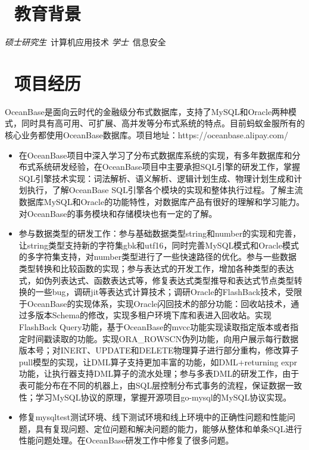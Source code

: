 \documentclass{resume}
\begin{document}


\section{\faGraduationCap\  教育背景}
\textit{硕士研究生}\ 计算机应用技术
\datedsubsection{\textbf{电子科技大学}}{2009 -- 2013}
\textit{学士}\ 信息安全\

\section{\faUsers\ 项目经历}
OceanBase是面向云时代的金融级分布式数据库，支持了MySQL和Oracle两种模式，同时具有高可用、可扩展、高并发等分布式系统的特点。目前蚂蚁金服所有的核心业务都使用OceanBase数据库。项目地址：https://oceanbase.alipay.com/
\begin{itemize}
  \item 在OceanBase项目中深入学习了分布式数据库系统的实现，有多年数据库和分布式系统研发经验，在OceanBase项目中主要承担SQL引擎的研发工作，掌握SQL引擎技术实现：词法解析、语义解析、逻辑计划生成、物理计划生成和计划执行，了解OceanBase SQL引擎各个模块的实现和整体执行过程。了解主流数据库MySQL和Oracle的功能特性，对数据库产品有很好的理解和学习能力。对OceanBase的事务模块和存储模块也有一定的了解。
  \item 参与数据类型的研发工作：参与基础数据类型string和number的实现和完善，让string类型支持新的字符集gbk和utf16，同时完善MySQL模式和Oracle模式的多字符集支持，对number类型进行了一些快速路径的优化。参与一些数据类型转换和比较函数的实现；参与表达式的开发工作，增加各种类型的表达式，如伪列表达式、函数表达式等，修复表达式类型推导和表达式节点类型转换的一些bug，调研jit等表达式计算技术；调研Oracle的FlashBack技术，受限于OceanBase的实现体系，实现Oracle闪回技术的部分功能：回收站技术，通过多版本Schema的修改，实现多租户环境下库和表进入回收站。实现FlashBack Query功能，基于OceanBase的mvcc功能实现读取指定版本或者指定时间戳读取的功能。实现ORA\_ROWSCN伪列功能，向用户展示每行数据版本号；对INERT、UPDATE和DELETE物理算子进行部分重构，修改算子pull模型的实现，让DML算子支持更加丰富的功能，如DML+returning expr功能，让执行器支持DML算子的流水处理；参与多表DML的研发工作，由于表可能分布在不同的机器上，由SQL层控制分布式事务的流程，保证数据一致性；学习MySQL协议的原理，掌握开源项目go-mysql的MySQL协议实现。
  \item 修复mysqltest测试环境、线下测试环境和线上环境中的正确性问题和性能问题，具有复现问题、定位问题和解决问题的能力，能够从整体和单条SQL进行性能问题处理。在OceanBase研发工作中修复了很多问题。
\end{itemize}
\end{document}
